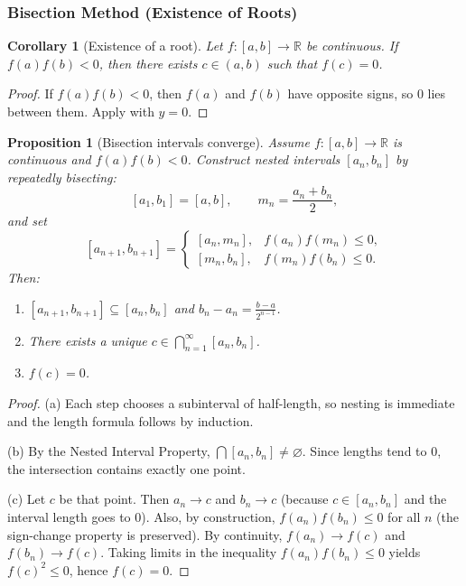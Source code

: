 \documentclass[12pt]{article}
\numberwithin{equation}{section}
\newcommand{\RR}{\mathbb{R}}
\let\emptyset\varnothing
\newcommand{\casesm}[1]{\begin{cases}#1\end{cases}}
\theoremstyle{plain}
\newtheorem{proposition}[theorem]{Proposition}
\newtheorem{corollary}[theorem]{Corollary}
\theoremstyle{definition}
\theoremstyle{remark}
\begin{document}
\subsubsection{Bisection Method (Existence of Roots)}

\begin{corollary}[Existence of a root]\label{cor:root-existence}
Let $f:[a,b]\to\RR$ be continuous.
If $f(a)f(b)<0$, then there exists $c\in(a,b)$ such that $f(c)=0$.
\end{corollary}

\begin{proof}
If $f(a)f(b)<0$, then $f(a)$ and $f(b)$ have opposite signs, so $0$ lies between them.
Apply  with $y=0$.
\end{proof}

\begin{proposition}[Bisection intervals converge]\label{prop:bisection}
Assume $f:[a,b]\to\RR$ is continuous and $f(a)f(b)<0$.
Construct nested intervals $[a_n,b_n]$ by repeatedly bisecting:
\[
[a_1,b_1]=[a,b],\qquad m_n=\frac{a_n+b_n}{2},
\]
and set
\[
[a_{n+1},b_{n+1}] =
\casesm{
[a_n,m_n], & f(a_n)f(m_n)\le 0,\\
[m_n,b_n], & f(m_n)f(b_n)\le 0.
}
\]
Then:
\begin{enumerate}[label=(\alph*)]
\item $[a_{n+1},b_{n+1}]\subseteq [a_n,b_n]$ and $b_n-a_n=\frac{b-a}{2^{n-1}}$.
\item There exists a unique $c\in\bigcap_{n=1}^\infty [a_n,b_n]$.
\item $f(c)=0$.
\end{enumerate}
\end{proposition}

\begin{proof}
(a) Each step chooses a subinterval of half-length, so nesting is immediate and the length formula follows by induction.

(b) By the Nested Interval Property, $\bigcap [a_n,b_n]\neq\emptyset$.
Since lengths tend to $0$, the intersection contains exactly one point.

(c) Let $c$ be that point.
Then $a_n\to c$ and $b_n\to c$ (because $c\in[a_n,b_n]$ and the interval length goes to $0$).
Also, by construction, $f(a_n)f(b_n)\le 0$ for all $n$ (the sign-change property is preserved).
By continuity, $f(a_n)\to f(c)$ and $f(b_n)\to f(c)$.
Taking limits in the inequality $f(a_n)f(b_n)\le 0$ yields $f(c)^2\le 0$, hence $f(c)=0$.
\end{proof}
\end{document}
